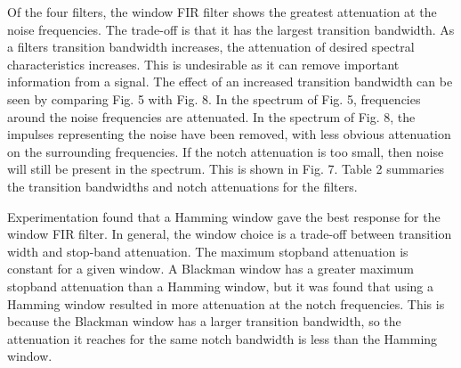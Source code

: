\documentclass[12pt]{article}
\begin{document}
\noindent Of the four filters, the window FIR filter shows the greatest attenuation at the noise frequencies.
The trade-off is that it has the largest transition bandwidth. As a filters transition bandwidth increases,
the attenuation of desired spectral characteristics increases. This is undesirable as it can remove important
information from a signal. The effect of an increased transition bandwidth can be seen by comparing Fig. 5 with
Fig. 8. In the spectrum of Fig. 5, frequencies around the noise frequencies are attenuated. In the spectrum of Fig. 8,
the impulses representing the noise have been removed, with less obvious attenuation on the surrounding frequencies.
If the notch attenuation is too small, then noise will still be present in the spectrum. This is shown in Fig. 7.
Table 2 summaries the transition bandwidths and notch attenuations for the filters.\\

\begin{table}[H]
    \caption{Notch frequency attenuations and 3 dB bandwidths for the filters.}
    \label{table:noise-freq-atten}
\end{table}

\noindent Experimentation found that a Hamming window gave the best response for the window FIR filter.
In general, the window choice is a trade-off between transition width and stop-band attenuation.
The maximum stopband attenuation is constant for a given window. A Blackman window has a greater
maximum stopband attenuation than a Hamming window, but it was found that using a Hamming window
resulted in more attenuation at the notch frequencies. This is because the Blackman window has a
larger transition bandwidth, so the attenuation it reaches for the same notch bandwidth is less 
than the Hamming window.\\
\end{document}

